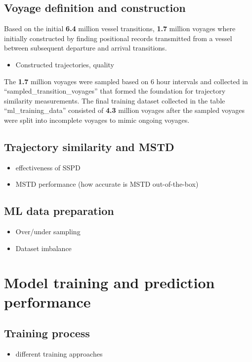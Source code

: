 \subsection{Voyage definition and construction}

Based on the initial \textbf{6.4} million vessel transitions, \textbf{1.7} million voyages where initially constructed by finding positional records transmitted from a vessel between subsequent departure and arrival transitions.

\begin{itemize}
    \item Constructed trajectories, quality
\end{itemize}

The \textbf{1.7} million voyages were sampled based on 6 hour intervals and collected in ``sampled\_transition\_voyages'' that formed the foundation for trajectory similarity measurements. The final training dataset collected in the table ``ml\_training\_data'' consisted of \textbf{4.3} million voyages after the sampled voyages were split into incomplete voyages to mimic ongoing voyages.

\subsection{Trajectory similarity and MSTD}

\begin{itemize}
    \item effectiveness of SSPD
    \item MSTD performance (how accurate is MSTD out-of-the-box)
\end{itemize}

\subsection{ML data preparation}

\begin{itemize}
    \item Over/under sampling
    \item Dataset imbalance
\end{itemize}

\section{Model training and prediction performance}

\subsection{Training process}
\begin{itemize}
    \item different training approaches
\end{itemize}

